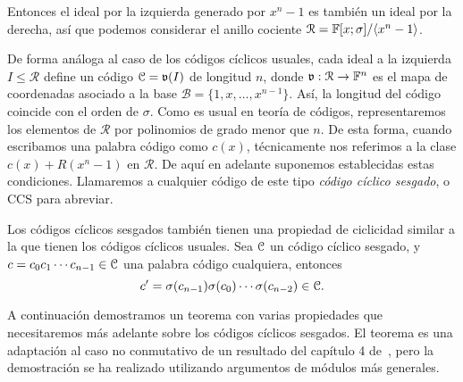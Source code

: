 Entonces el ideal por la izquierda generado por \(x^{n} - 1\) es también un ideal por la derecha, así que podemos considerar el anillo cociente \(\mathcal{R} = \mathbb{F}[x;\sigma] / \langle x^n -1 \rangle\).

De forma análoga al caso de los códigos cíclicos usuales, cada ideal a la izquierda \(I \leq \mathcal{R}\) define un código \(\mathcal{C} =\mathfrak{v}(I)\) de longitud  \(n\), donde \(\mathfrak{v}:\mathcal{R} \rightarrow \mathbb{F}^n\) es el mapa de coordenadas asociado a la base \(\mathcal{B} = \{1, x, \dots, x^{n-1}\}\). Así, la longitud del código coincide con el orden de \(\sigma\). Como es usual en teoría de códigos, representaremos los elementos de \(\mathcal{R}\) por polinomios de grado menor que \(n\). De esta forma, cuando escribamos una palabra código como \(c(x)\), técnicamente nos referimos a la clase  \(c(x) + R(x^{n} - 1)\) en \( \mathcal{R}\). De aquí en adelante suponemos establecidas estas condiciones. Llamaremos a cualquier código de este tipo \textit{código cíclico sesgado}, o CCS para abreviar.

Los códigos cíclicos sesgados también tienen una propiedad de ciclicidad similar a la que tienen los códigos cíclicos usuales. Sea \(\mathcal{C}\) un código cíclico sesgado, y  \(c = c_0 c_1\cdots c_{n-1} \in \mathcal{C}\) una palabra código cualquiera, entonces
\[c' = \sigma(c_{n-1})\sigma(c_0) \cdots \sigma(c_{n-2}) \in \mathcal{C} .\]

A continuación demostramos un teorema con varias propiedades que necesitaremos más adelante sobre los códigos cíclicos sesgados. El teorema es una adaptación al caso no conmutativo de un resultado del capítulo 4 de~\cite{huffman_fundamentals_2003}, pero la demostración se ha realizado utilizando argumentos de módulos más generales.

